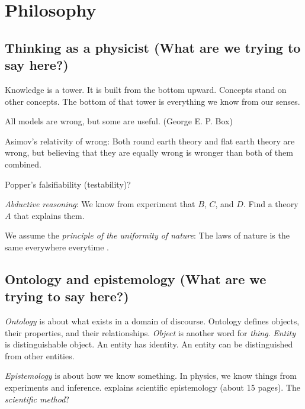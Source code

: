 \chapter{Philosophy}

\section{Thinking as a physicist (What are we trying to say here?)}

Knowledge is a tower.
It is built from the bottom upward.
Concepts stand on other concepts.
The bottom of that tower is everything we know from our senses.

All models are wrong, but some are useful. (George E. P. Box)

Asimov's relativity of wrong:
Both round earth theory and flat earth theory are wrong,
but believing that they are equally wrong
is wronger than both of them combined.

Popper's falsifiability (testability)?

\emph{Abductive reasoning}:
We know from experiment that \(B\), \(C\), and \(D\).
Find a theory \(A\) that explains them.

%
We assume the \emph{principle of the uniformity of nature}:
The laws of nature is the same everywhere everytime \cite{hume1793inquiry}.

\section{Ontology and epistemology (What are we trying to say here?)}

\emph{Ontology} is about what exists in a domain of discourse.
Ontology defines objects, their properties, and their relationships.
\emph{Object} is another word for \emph{thing}.
\emph{Entity} is distinguishable object.
An entity has identity.
An entity can be distinguished from other entities.

\emph{Epistemology} is about how we know something.
In physics, we know things from experiments and inference.
\cite{wenning2009scientific} explains scientific epistemology (about 15 pages).
The \emph{scientific method}?

